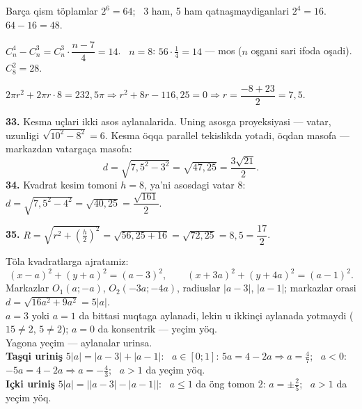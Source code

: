 Barça qism töplamlar $2^6=64$; \ 3 ham, 5 ham qatnaşmaydiganlari $2^4=16$. \ $64-16=48$.

$C_n^4-C_n^3=C_n^3\cdot\dfrac{n-7}4=14$. \ $n=8$: $56\cdot\frac14=14$ — mos ($n$ oşgani sari ifoda oşadi).\\
$C_8^2=28$.

\newpage
{}
$2\pi r^2+2\pi r\cdot8=232{,}5\pi\Rightarrow r^2+8r-116{,}25=0\Rightarrow r=\dfrac{-8+23}2=7{,}5$.

\textbf{33.} Kesma uçlari ikki asos aylanalarida. Uning asosga proyeksiyasi — vatar, uzunligi $\sqrt{10^2-8^2}=6$. Kesma öqqa parallel tekislikda yotadi, öqdan masofa — markazdan vatargaça masofa:
\[d=\sqrt{7{,}5^2-3^2}=\sqrt{47{,}25}=\frac{3\sqrt{21}}2.\]
\textbf{34.} Kvadrat kesim tomoni $h=8$, ya'ni asosdagi vatar 8: \ $d=\sqrt{7{,}5^2-4^2}=\sqrt{40{,}25}=\dfrac{\sqrt{161}}2$.

\textbf{35.} $R=\sqrt{r^2+\left(\frac h2\right)^2}=\sqrt{56{,}25+16}=\sqrt{72{,}25}=8{,}5=\dfrac{17}2$.

\newpage
{}
Töla kvadratlarga ajratamiz:
\[(x-a)^2+(y+a)^2=(a-3)^2,\qquad (x+3a)^2+(y+4a)^2=(a-1)^2.\]
Markazlar $O_1(a;-a)$, $O_2(-3a;-4a)$, radiuslar $|a-3|$, $|a-1|$; markazlar orasi $d=\sqrt{16a^2+9a^2}=5|a|$.\\
$a=3$ yoki $a=1$ da bittasi nuqtaga aylanadi, lekin u ikkinçi aylanada yotmaydi ($15\ne2$, $5\ne2$); $a=0$ da konsentrik — yeçim yöq.\\
Yagona yeçim — aylanalar urinsa.\\
\textbf{Taşqi uriniş} $5|a|=|a-3|+|a-1|$: \ $a\in[0;1]$: $5a=4-2a\Rightarrow a=\frac47$; \ $a<0$: $-5a=4-2a\Rightarrow a=-\frac43$; \ $a>1$ da yeçim yöq.\\
\textbf{Içki uriniş} $5|a|=\bigl||a-3|-|a-1|\bigr|$: \ $a\le1$ da öng tomon $2$: $a=\pm\frac25$; \ $a>1$ da yeçim yöq.

